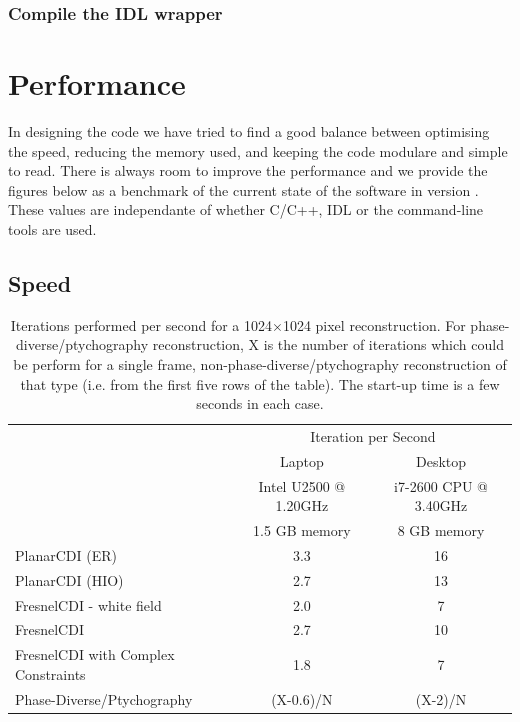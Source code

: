 \documentclass[]{cxs-software}
\begin{document}
\subsubsection{Compile the IDL wrapper}

\newpage

\section{Performance}

In designing the code we have tried to find a good balance between
optimising the speed, reducing the memory used, and keeping the code
modulare and simple to read. There is always room to improve the
performance and we provide the figures below as a benchmark of the
current state of the software in version \ver. These values are
independante of whether C/C++, IDL or the command-line tools are used.

\subsection{Speed}

\begin{table}[h!]
\begin{tabular}[h!]{lcc}
\toprule
   & \multicolumn{2}{c}{Iteration per Second} \\
   & Laptop & Desktop \\
   & Intel U2500 @ 1.20GHz & i7-2600 CPU @ 3.40GHz \\
   & 1.5 GB memory & 8 GB memory\\

\midrule
PlanarCDI (ER) & 3.3  &  16 \\
PlanarCDI (HIO) & 2.7 & 13 \\
FresnelCDI - white field & 2.0 & 7 \\
FresnelCDI & 2.7 & 10 \\
FresnelCDI with Complex Constraints & 1.8 & 7 \\
Phase-Diverse/Ptychography & (X-0.6)/N  & (X-2)/N  \\
\bottomrule
\end{tabular}

\caption{\label{table:speed} Iterations performed per second for a
  1024$\times$1024 pixel reconstruction. For
  phase-diverse/ptychography reconstruction, X is the number of
  iterations which could be perform for a single frame,
  non-phase-diverse/ptychography reconstruction of that type
  (i.e. from the first five rows of the table). The start-up time is a
  few seconds in each case. }
\end{table}
\end{document}
